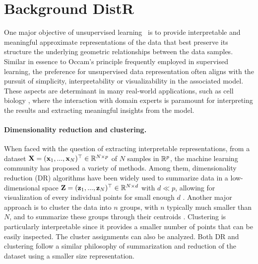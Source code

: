 \section{Background DistR}

One major objective of unsupervised learning~\cite{Hastie2009} is to provide interpretable and meaningful approximate representations of the data that best preserve its structure \ie the underlying geometric relationships between the data samples.
Similar in essence to Occam's principle frequently employed in supervised learning, the preference for unsupervised data representation often aligns with the pursuit of simplicity, interpretability or visualizability in the associated model.
These aspects are determinant in many real-world applications, such as cell biology
\cite{cantini2021benchmarking, ventre2023one}, where the interaction with domain experts is paramount for interpreting the results and extracting meaningful insights from the model. 

\paragraph{Dimensionality reduction and clustering.}
When faced with the question of extracting
interpretable representations, from a dataset ${\mathbf{X}} = ({\mathbf{x}}_1, ..., {\mathbf{x}}_N) ^\top
\in \mathbb{R}^{N \times p}$ of $N$ samples in $\mathbb{R}^p$, the machine learning community
has proposed a variety of methods. Among them, dimensionality reduction (DR) algorithms have been widely used to summarize data in a low-dimensional space
${\mathbf{Z}} = ({\mathbf{z}}_1, ..., {\mathbf{z}}_N) ^\top \in \mathbb{R}^{N \times d}$ with $d \ll p$, allowing
for visualization of every individual points for small enough $d$ \cite{agrawal2021minimum,van2009dimensionality}.
Another major approach is to cluster the data into $n$ groups, with $n$
typically much smaller than $N$, and to summarize these groups through their centroids \cite{saxena2017review,ezugwu2022comprehensive}.
Clustering is particularly interpretable since it provides a
smaller number of points that can be easily inspected. %
The cluster assignments can also be analyzed. %
Both DR and clustering follow a
similar philosophy of summarization and reduction of the dataset using a smaller size representation.

